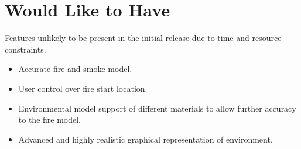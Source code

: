 \section{Would Like to Have}

Features unlikely to be present in the initial release due to time
and resource constraints.
\begin{itemize}
\item Accurate fire and smoke model.
\item User control over fire start location.
\item Environmental model support of different materials to allow further
accuracy to the fire model.
\item Advanced and highly realistic graphical representation of environment.\end{itemize}
